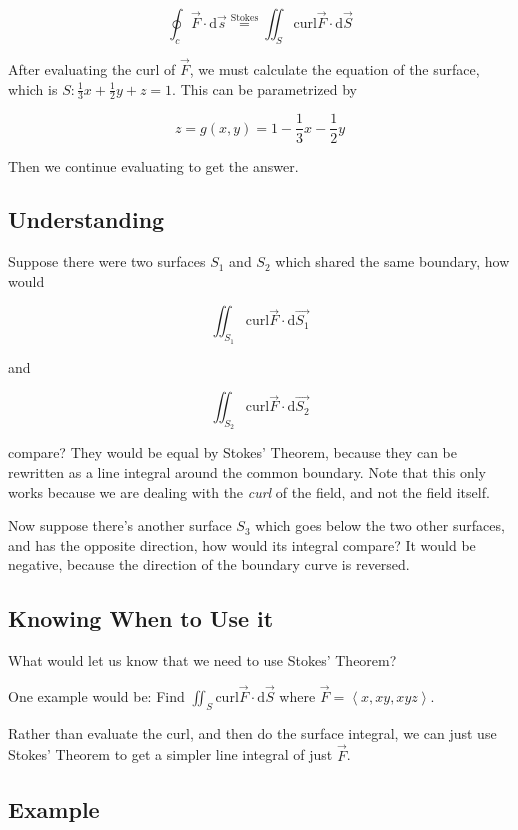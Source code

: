\documentclass{article}
\newcommand{\D}[1]{\mathrm{d}#1}
\begin{document}
\[
\oint_c \vec{F} \cdot \D{\vec{s}} \overset{\text{Stokes}}{=} \iint_S \text{curl} \vec{F} \cdot \D{\vec{S}}
\]

After evaluating the curl of $\vec{F}$, we must calculate the equation of the surface, which is $S: \frac{1}{3} x + \frac{1}{2} y + z = 1$. This can be parametrized by

\[
z = g(x,y) = 1 - \frac{1}{3} x - \frac{1}{2} y
\]

Then we continue evaluating to get the answer.

\subsection*{Understanding}

Suppose there were two surfaces $S_1$ and $S_2$ which shared the same boundary, how would

\[
\iint_{S_1} \text{curl} \vec{F} \cdot \D{\vec{S_1}}
\]

and

\[
\iint_{S_2} \text{curl} \vec{F} \cdot \D{\vec{S_2}}
\]

compare? They would be equal by Stokes' Theorem, because they can be rewritten as a line integral around the common boundary. Note that this only works because we are dealing with the \textit{curl} of the field, and not the field itself.

Now suppose there's another surface $S_3$ which goes below the two other surfaces, and has the opposite direction, how would its integral compare? It would be negative, because the direction of the boundary curve is reversed.

\subsection*{Knowing When to Use it}

What would let us know that we need to use Stokes' Theorem?

One example would be: Find $\iint_S \text{curl} \vec{F} \cdot \D{\vec{S}}$ where $\vec{F} = \left<x, x y, x y z\right>$.

Rather than evaluate the curl, and then do the surface integral, we can just use Stokes' Theorem to get a simpler line integral of just $\vec{F}$.

\subsection*{Example}
\end{document}
